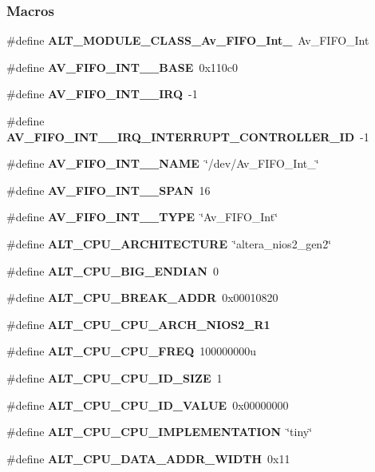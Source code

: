 \subsubsection*{Macros}
\begin{DoxyCompactItemize}
\item 
\#define {\bf A\+L\+T\+\_\+\+M\+O\+D\+U\+L\+E\+\_\+\+C\+L\+A\+S\+S\+\_\+\+Av\+\_\+\+F\+I\+F\+O\+\_\+\+Int\+\_}~Av\+\_\+\+F\+I\+F\+O\+\_\+\+Int
\item 
\#define {\bf A\+V\+\_\+\+F\+I\+F\+O\+\_\+\+I\+N\+T\+\_\+\_\+\+B\+A\+SE}~0x110c0
\item 
\#define {\bf A\+V\+\_\+\+F\+I\+F\+O\+\_\+\+I\+N\+T\+\_\+\_\+\+I\+RQ}~-\/1
\item 
\#define {\bf A\+V\+\_\+\+F\+I\+F\+O\+\_\+\+I\+N\+T\+\_\+\_\+\+I\+R\+Q\+\_\+\+I\+N\+T\+E\+R\+R\+U\+P\+T\+\_\+\+C\+O\+N\+T\+R\+O\+L\+L\+E\+R\+\_\+\+ID}~-\/1
\item 
\#define {\bf A\+V\+\_\+\+F\+I\+F\+O\+\_\+\+I\+N\+T\+\_\+\_\+\+N\+A\+ME}~\char`\"{}/dev/Av\+\_\+\+F\+I\+F\+O\+\_\+\+Int\+\_\char`\"{}
\item 
\#define {\bf A\+V\+\_\+\+F\+I\+F\+O\+\_\+\+I\+N\+T\+\_\+\_\+\+S\+P\+AN}~16
\item 
\#define {\bf A\+V\+\_\+\+F\+I\+F\+O\+\_\+\+I\+N\+T\+\_\+\_\+\+T\+Y\+PE}~\char`\"{}Av\+\_\+\+F\+I\+F\+O\+\_\+\+Int\char`\"{}
\item 
\#define {\bf A\+L\+T\+\_\+\+C\+P\+U\+\_\+\+A\+R\+C\+H\+I\+T\+E\+C\+T\+U\+RE}~\char`\"{}altera\+\_\+nios2\+\_\+gen2\char`\"{}
\item 
\#define {\bf A\+L\+T\+\_\+\+C\+P\+U\+\_\+\+B\+I\+G\+\_\+\+E\+N\+D\+I\+AN}~0
\item 
\#define {\bf A\+L\+T\+\_\+\+C\+P\+U\+\_\+\+B\+R\+E\+A\+K\+\_\+\+A\+D\+DR}~0x00010820
\item 
\#define {\bf A\+L\+T\+\_\+\+C\+P\+U\+\_\+\+C\+P\+U\+\_\+\+A\+R\+C\+H\+\_\+\+N\+I\+O\+S2\+\_\+\+R1}
\item 
\#define {\bf A\+L\+T\+\_\+\+C\+P\+U\+\_\+\+C\+P\+U\+\_\+\+F\+R\+EQ}~100000000u
\item 
\#define {\bf A\+L\+T\+\_\+\+C\+P\+U\+\_\+\+C\+P\+U\+\_\+\+I\+D\+\_\+\+S\+I\+ZE}~1
\item 
\#define {\bf A\+L\+T\+\_\+\+C\+P\+U\+\_\+\+C\+P\+U\+\_\+\+I\+D\+\_\+\+V\+A\+L\+UE}~0x00000000
\item 
\#define {\bf A\+L\+T\+\_\+\+C\+P\+U\+\_\+\+C\+P\+U\+\_\+\+I\+M\+P\+L\+E\+M\+E\+N\+T\+A\+T\+I\+ON}~\char`\"{}tiny\char`\"{}
\item 
\#define {\bf A\+L\+T\+\_\+\+C\+P\+U\+\_\+\+D\+A\+T\+A\+\_\+\+A\+D\+D\+R\+\_\+\+W\+I\+D\+TH}~0x11

\end{DoxyCompactItemize}
